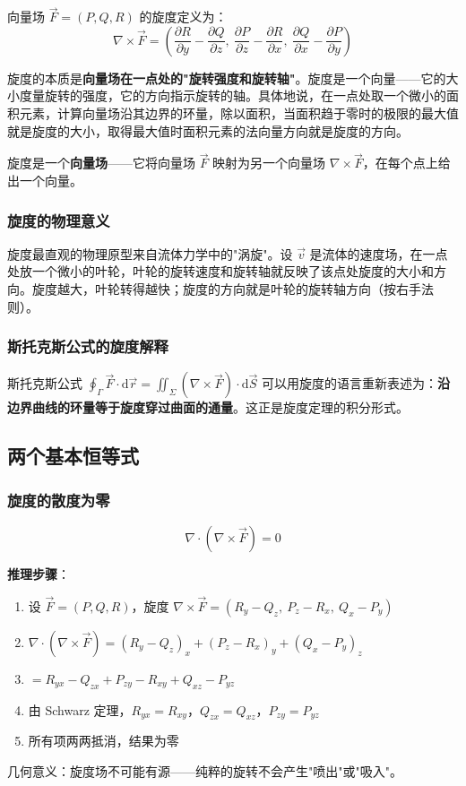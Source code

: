 向量场 $\vec{F} = (P, Q, R)$ 的旋度定义为：
\[
\nabla\times\vec{F} = \left(\frac{\partial R}{\partial y}-\frac{\partial Q}{\partial z},\ \frac{\partial P}{\partial z}-\frac{\partial R}{\partial x},\ \frac{\partial Q}{\partial x}-\frac{\partial P}{\partial y}\right)
\]

\begin{essencebox}
旋度的本质是\textbf{向量场在一点处的"旋转强度和旋转轴"}。旋度是一个向量——它的大小度量旋转的强度，它的方向指示旋转的轴。具体地说，在一点处取一个微小的面积元素，计算向量场沿其边界的环量，除以面积，当面积趋于零时的极限的最大值就是旋度的大小，取得最大值时面积元素的法向量方向就是旋度的方向。

旋度是一个\textbf{向量场}——它将向量场 $\vec{F}$ 映射为另一个向量场 $\nabla\times\vec{F}$，在每个点上给出一个向量。
\end{essencebox}

\subsubsection{旋度的物理意义}

旋度最直观的物理原型来自流体力学中的"涡旋"。设 $\vec{v}$ 是流体的速度场，在一点处放一个微小的叶轮，叶轮的旋转速度和旋转轴就反映了该点处旋度的大小和方向。旋度越大，叶轮转得越快；旋度的方向就是叶轮的旋转轴方向（按右手法则）。

\subsubsection{斯托克斯公式的旋度解释}

斯托克斯公式 $\oint_\Gamma \vec{F}\cdot\mathrm{d}\vec{r} = \iint_\Sigma (\nabla\times\vec{F})\cdot\mathrm{d}\vec{S}$ 可以用旋度的语言重新表述为：\textbf{沿边界曲线的环量等于旋度穿过曲面的通量}。这正是旋度定理的积分形式。

\subsection{两个基本恒等式}

\subsubsection{旋度的散度为零}

\[
\nabla\cdot(\nabla\times\vec{F}) = 0
\]

\begin{insightbox}
\textbf{推理步骤}：
\begin{enumerate}[leftmargin=2em]
    \item 设 $\vec{F} = (P, Q, R)$，旋度 $\nabla\times\vec{F} = (R_y-Q_z,\ P_z-R_x,\ Q_x-P_y)$
    \item $\nabla\cdot(\nabla\times\vec{F}) = (R_y-Q_z)_x + (P_z-R_x)_y + (Q_x-P_y)_z$
    \item $= R_{yx} - Q_{zx} + P_{zy} - R_{xy} + Q_{xz} - P_{yz}$
    \item 由 Schwarz 定理，$R_{yx}=R_{xy}$，$Q_{zx}=Q_{xz}$，$P_{zy}=P_{yz}$
    \item 所有项两两抵消，结果为零
\end{enumerate}
几何意义：旋度场不可能有源——纯粹的旋转不会产生"喷出"或"吸入"。
\end{insightbox}

